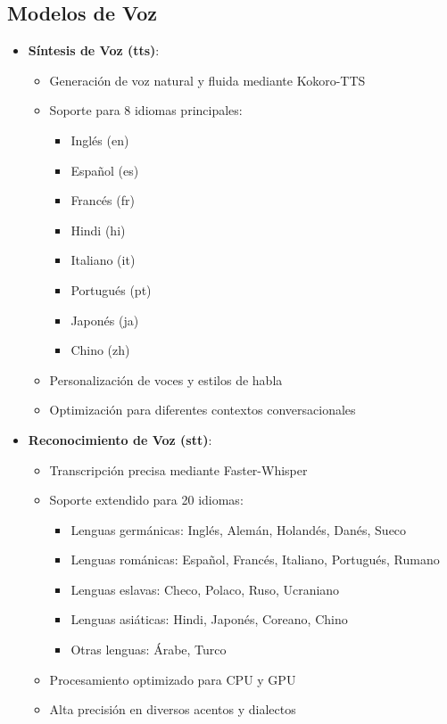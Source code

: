 \subsection{Modelos de Voz}
\begin{itemize}
	\item \textbf{Síntesis de Voz (\gls{tts})}:
	      \begin{itemize}
		      \item Generación de voz natural y fluida mediante Kokoro-TTS
		      \item Soporte para 8 idiomas principales:
		            \begin{itemize}
			            \item Inglés (en)
			            \item Español (es)
			            \item Francés (fr)
			            \item Hindi (hi)
			            \item Italiano (it)
			            \item Portugués (pt)
			            \item Japonés (ja)
			            \item Chino (zh)
		            \end{itemize}
		      \item Personalización de voces y estilos de habla
		      \item Optimización para diferentes contextos conversacionales
	      \end{itemize}

	\item \textbf{Reconocimiento de Voz (\gls{stt})}:
	      \begin{itemize}
		      \item Transcripción precisa mediante Faster-Whisper
		      \item Soporte extendido para 20 idiomas:
		            \begin{itemize}
			            \item Lenguas germánicas: Inglés, Alemán, Holandés, Danés, Sueco
			            \item Lenguas románicas: Español, Francés, Italiano, Portugués, Rumano
			            \item Lenguas eslavas: Checo, Polaco, Ruso, Ucraniano
			            \item Lenguas asiáticas: Hindi, Japonés, Coreano, Chino
			            \item Otras lenguas: Árabe, Turco
		            \end{itemize}
		      \item Procesamiento optimizado para CPU y GPU
		      \item Alta precisión en diversos acentos y dialectos
	      \end{itemize}
\end{itemize}


